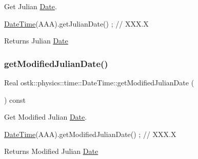 Get Julian \hyperlink{classostk_1_1physics_1_1time_1_1_date}{Date}. 


\begin{DoxyCode}
\hyperlink{classostk_1_1physics_1_1time_1_1_date_time_a974b5a7581ae7461ccf0e6ab85e42633}{DateTime}(AAA).getJulianDate() ; \textcolor{comment}{// XXX.X}
\end{DoxyCode}


\begin{DoxyReturn}{Returns}
Julian \hyperlink{classostk_1_1physics_1_1time_1_1_date}{Date} 
\end{DoxyReturn}
\mbox{\label{classostk_1_1physics_1_1time_1_1_date_time_a8f2ca8f9d2a8e1828c8f92827e1803ca}} 
\subsubsection{\texorpdfstring{get\+Modified\+Julian\+Date()}{getModifiedJulianDate()}}
{\footnotesize\ttfamily Real ostk\+::physics\+::time\+::\+Date\+Time\+::get\+Modified\+Julian\+Date (\begin{DoxyParamCaption}{ }\end{DoxyParamCaption}) const}



Get Modified Julian \hyperlink{classostk_1_1physics_1_1time_1_1_date}{Date}. 


\begin{DoxyCode}
\hyperlink{classostk_1_1physics_1_1time_1_1_date_time_a974b5a7581ae7461ccf0e6ab85e42633}{DateTime}(AAA).getModifiedJulianDate() ; \textcolor{comment}{// XXX.X}
\end{DoxyCode}


\begin{DoxyReturn}{Returns}
Modified Julian \hyperlink{classostk_1_1physics_1_1time_1_1_date}{Date} 
\end{DoxyReturn}
\mbox{\label{classostk_1_1physics_1_1time_1_1_date_time_ae1460f38a9e41c5c7e42874de571d9f9}} 

